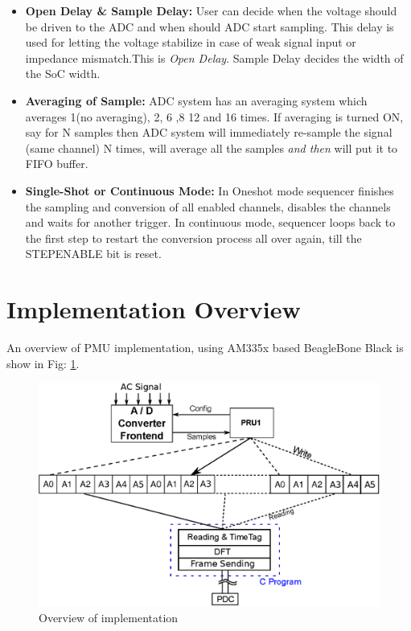 \begin{itemize}
	\item \textbf{Open Delay \& Sample Delay:} User can decide when the voltage should be driven to the ADC and when should ADC start sampling. This delay is used for letting the voltage stabilize in case of weak signal input or impedance mismatch.This is \textit{Open Delay}. Sample Delay decides the width of the SoC width.
	\item \textbf{Averaging of Sample:} ADC system has an averaging system which averages 1(no averaging), 2, 6 ,8 12 and 16 times. If averaging is turned ON, say for N samples then ADC system will immediately re-sample the signal (same channel) N times, will average all the samples \textit{and then} will put it to FIFO buffer.
	\item \textbf{Single-Shot or Continuous Mode:} In Oneshot mode sequencer finishes the sampling and conversion of all enabled channels, disables the channels and waits for another trigger. In continuous mode, sequencer loops back to the first step to restart the conversion process all over again, till the STEPENABLE bit is reset.    
\end{itemize} 

\section{Implementation Overview}
An overview of PMU implementation, using AM335x based BeagleBone Black is show in Fig: \ref{fig:implementation}.

\begin{figure}[h]
	\includegraphics[width=\textwidth]{fig/sys_overview.eps}
	\caption{Overview of implementation}
	\label{fig:implementation}
\end{figure}

